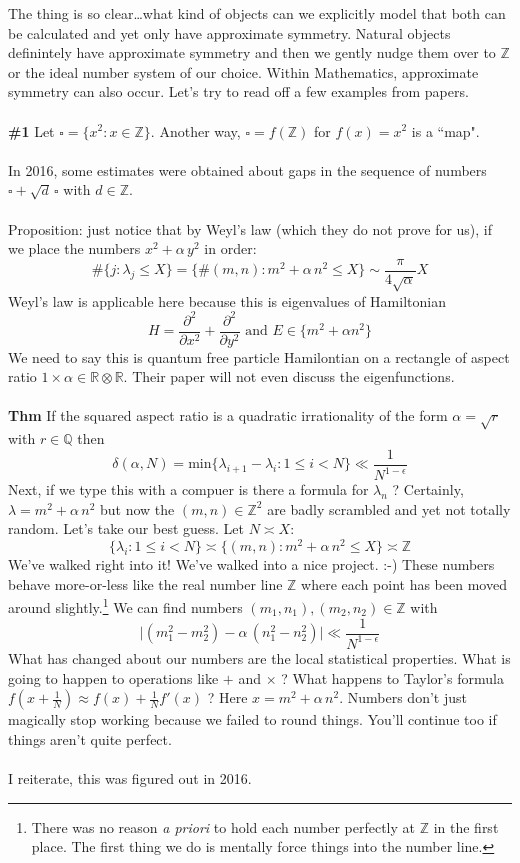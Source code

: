 \documentclass[12pt]{article}
\begin{document}
\noindent The thing is so clear\dots what kind of objects can we explicitly model that both can be calculated and yet only have approximate symmetry.  Natural objects definintely have approximate symmetry and then we gently nudge them over to $\mathbb{Z}$ or the ideal number system of our choice.  Within Mathematics, approximate symmetry can also occur. Let's try to read off a few examples from papers. \\ \\
\textbf{\#1} Let $\square = \{ x^2 : x \in \mathbb{Z}\}$.  Another way, $\square = f(\mathbb{Z})$ for $f(x) = x^2$ is a ``map".  \\ \\
In 2016, some estimates were obtained about gaps in the sequence of numbers $\square + \sqrt{d} \, \square$ with $d \in \mathbb{Z}$.  \\ \\
Proposition: just notice that by Weyl's law (which they do not prove for us), if we place the numbers $x^2 + \alpha \, y^2 $ in order:
$$ \#\{ j :  \lambda_j \leq X \} = \{ \# (m,n) : m^2 + \alpha \, n^2 \leq X \} \sim \frac{\pi}{4 \sqrt{\alpha}} X  $$
Weyl's law is applicable here because this is eigenvalues of Hamiltonian 
$$  H =  \frac{\partial^2 }{\partial x^2} + \frac{\partial^2 }{\partial y^2} \text{ and }E \in \{ m^2 + \alpha n^2 \} $$
We need to say this is quantum free particle Hamilontian on a rectangle of aspect ratio $1 \times \alpha \in \mathbb{R} \otimes \mathbb{R}$.  Their paper will not even discuss the eigenfunctions.  \\ \\
\textbf{Thm} If the squared aspect ratio is a quadratic irrationality of the form $\alpha = \sqrt{r}$ with $r \in \mathbb{Q}$ then 
$$ \delta(\alpha, N) = \text{min} \{ \lambda_{i+1} - \lambda_i : 1 \leq i < N \} \ll \frac{1}{N^{1-\epsilon}} $$ 
Next, if we type this with a compuer is there a formula for $\lambda_n$ ? Certainly, $\lambda = m^2 + \alpha \, n^2 $  but now the $(m,n) \in \mathbb{Z}^2$ are badly scrambled and yet not totally random. Let's take our best guess.  Let $N \asymp X$:
$$ \{ \lambda_i : 1 \leq i < N \} \asymp
\{ (m,n): m^2 + \alpha \, n^2 \leq X \} \asymp \mathbb{Z} $$
We've walked right into it!  We've walked into a nice project. :-) These numbers behave more-or-less like the real number line $\mathbb{Z}$ where each point has been moved around slightly.\footnote{There was no reason \textit{a priori} to hold each number perfectly at $\mathbb{Z}$ in the first place.  The first thing we do is mentally force things into the number line.} We can find numbers $(m_1, n_1), (m_2, n_2) \in \mathbb{Z}$ with 
$$ \big| (m_1^2 - m_2^2) -  \alpha \, (n_1^2 - n_2^2) \big| \ll \frac{1}{N^{1-\epsilon}} $$
What has changed about our numbers are the local statistical properties.  What is going to happen to operations like $+$ and $\times$ ? What happens to Taylor's formula $f(x + \frac{1}{N}) \approx f(x) + \frac{1}{N}f'(x)$ ? Here $x = m^2 + \alpha \, n^2$.  Numbers don't just magically stop working because we failed to round things.  You'll continue too if things aren't quite perfect. \\ \\
I reiterate, this was figured out in 2016.
\end{document}
